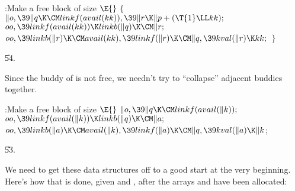 \B{}:Make  a free block of size \X${}\E{}$\6
${}\{{}$\1\6
${}\|o,\39\|q\K\CM\\{linkf}(\\{avail}(\\{kk})),\39\|r\K\|p+(\T{1}\LL\\{kk});{}$%
\6
${}\\{oo},\39\\{linkf}(\\{avail}(\\{kk}))\K\\{linkb}(\|q)\K\CM\|r;{}$\6
${}\\{oo},\39\\{linkb}(\|r)\K\CM\\{avail}(\\{kk}),\39\\{linkf}(\|r)\K\CM\|q,\39%
\\{kval}(\|r)\K\\{kk};{}$\6
\4${}\}{}$\2\par
\U54.\fi

Since the buddy of  is not free, we needn't try to ``collapse''
adjacent
buddies together.

\Y\B\4:Make  a free block of size \X${}\E{}$\6
$\|o,\39\|q\K\CM\\{linkf}(\\{avail}(\|k));{}$\6
${}\\{oo},\39\\{linkf}(\\{avail}(\|k))\K\\{linkb}(\|q)\K\CM\|a;{}$\6
${}\\{oo},\39\\{linkb}(\|a)\K\CM\\{avail}(\|k),\39\\{linkf}(\|a)\K\CM\|q,\39%
\\{kval}(\|a)\K\|k{}$;\par
\U53.\fi

We need to get these data structures off to a good start at the very
beginning. Here's how that is done, given  and ,
after the arrays  and  have been allocated:

